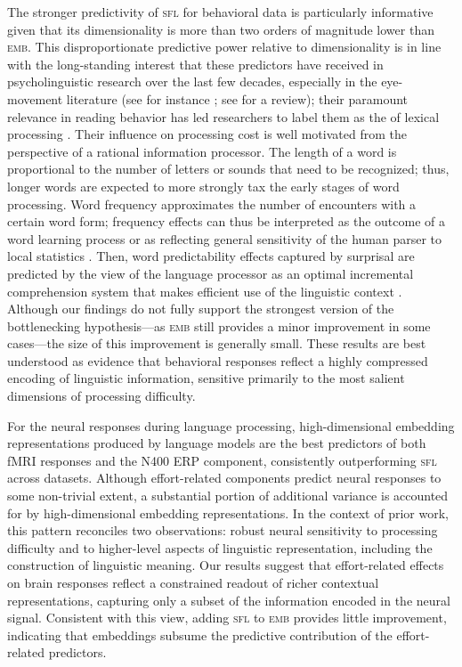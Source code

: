 \documentclass[11pt]{article}
\begin{document}
\smallskip

The stronger predictivity of \textsc{sfl} for behavioral data is particularly informative given that its dimensionality is more than two orders of magnitude lower than \textsc{emb}. This disproportionate predictive power relative to dimensionality is in line with the long-standing interest that these predictors have received in psycholinguistic research over the last few decades, especially in the eye-movement literature (see for instance \citealp{just1980theory, rayner1996eye, rayner1986lexical}; see \citealp{rayner1998eye} for a review); their paramount relevance in reading behavior has led researchers to label them as the  of lexical processing \citep{clifton2016eye}. Their influence on processing cost is well motivated from the perspective of a rational information processor. The length of a word is proportional to the number of letters or sounds that need to be recognized; thus, longer words are expected to more strongly tax the early stages of word processing. Word frequency approximates the number of encounters with a certain word form; frequency effects can thus be interpreted as the outcome of a word learning process \citep{brysbaert2018word} or as reflecting general sensitivity of the human parser to local statistics \citep{goodkind2021local}. Then, word predictability effects captured by surprisal are predicted by the view of the language processor as an optimal incremental comprehension system that makes efficient use of the linguistic context \citep{levy2008, effectislogarithmic, berzak2022eye, shain_log}. Although our findings do not fully support the strongest version of the bottlenecking hypothesis---as \textsc{emb} still provides a minor improvement in some cases---the size of this improvement is generally small. These results are best understood as evidence that behavioral responses reflect a highly compressed encoding of linguistic information, sensitive primarily to the most salient dimensions of processing difficulty. 

\smallskip

For the neural responses during language processing, high-dimensional embedding representations produced by language models are the best predictors of both fMRI responses and the N400 ERP component, consistently outperforming \textsc{sfl} across datasets. Although effort-related components predict neural responses to some non-trivial extent, a substantial portion of additional variance is accounted for by high-dimensional embedding representations. In the context of prior work, this pattern reconciles two observations: robust neural sensitivity to processing difficulty and to higher-level aspects of linguistic representation, including the construction of linguistic meaning. Our results suggest that effort-related effects on brain responses reflect a constrained readout of richer contextual representations, capturing only a subset of the information encoded in the neural signal. Consistent with this view, adding \textsc{sfl} to \textsc{emb} provides little improvement, indicating that embeddings subsume the predictive contribution of the effort-related predictors.
\end{document}
